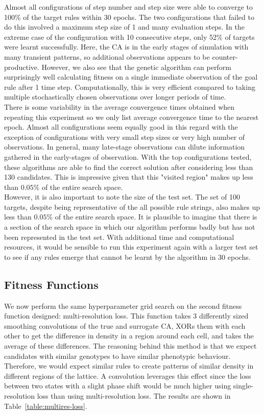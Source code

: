 Almost all configurations of step number and step size were able to converge to 100\% of the target rules within 30 epochs. The two configurations that failed to do this involved a maximum step size of 1 and many evaluation steps. In the extreme case of the configuration with 10 consecutive steps, only 52\% of targets were learnt successfully. Here, the CA is in the early stages of simulation with many transient patterns, so additional observations appears to be counter-productive. However, we also see that the genetic algorithm can perform surprisingly well calculating fitness on a single immediate observation of the goal rule after 1 time step. Computationally, this is very efficient compared to taking multiple stochastically chosen observations over longer periods of time. \\

There is some variability in the average convergence times obtained when repeating this experiment so we only list average convergence time to the nearest epoch. Almost all configurations seem equally good in this regard with the exception of configurations with very small step sizes or very high number of observations. In general, many late-stage observations can dilute information gathered in the early-stages of observation. With the top configurations tested, these algorithms are able to find the correct solution after considering less than 130 candidates. This is impressive given that this "visited region" makes up less than $0.05\%$ of the entire search space.\\

However, it is also important to note the size of the test set. The set of 100 targets, despite being representative of the all possible rule strings, also makes up less than $0.05\%$ of the entire search space. It is plausible to imagine that there is a section of the search space in which our algorithm performs badly but has not been represented in the test set. With additional time and computational resources, it would be sensible to run this experiment again with a larger test set to see if any rules emerge that cannot be learnt by the algorithm in 30 epochs.

\subsection{Fitness Functions}

We now perform the same hyperparameter grid search on the second fitness function designed: multi-resolution loss. This function takes 3 differently sized smoothing convolutions of the true and surrogate CA, XORs them with each other to get the difference in density in a region around each cell, and takes the average of these differences. The reasoning behind this method is that we expect candidates with similar genotypes to have similar phenotypic behaviour. Therefore, we would expect similar rules to create patterns of similar density in different regions of the lattice. A convolution leverages this effect since the loss between two states with a slight phase shift would be much higher using single-resolution loss than using multi-resolution loss. The results are shown in Table~\ref{table:multires-loss}.

